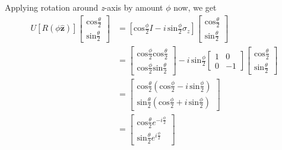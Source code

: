 \begin{alphaparts}
Applying rotation around \textit{z}-axis by amount $\phi$ now, we get 
\begin{equation*}
    \begin{split}
        U[R(\phi\hat{\mathbf{z}})]
        \begin{bmatrix}
            \textrm{cos}\frac{\theta}{2} \\
            \textrm{sin}\frac{\theta}{2}
        \end{bmatrix} & = \left[ \textrm{cos}\frac{\phi}{2}I - i \, \textrm{sin}\frac{\phi}{2}\sigma_{z} \right]
        \begin{bmatrix}
            \textrm{cos}\frac{\theta}{2} \\
            \textrm{sin}\frac{\theta}{2}
        \end{bmatrix} \\
        & = 
        \begin{bmatrix}
            \textrm{cos}\frac{\phi}{2}\textrm{cos}\frac{\theta}{2} \\
            \textrm{cos}\frac{\phi}{2}\textrm{sin}\frac{\theta}{2}
        \end{bmatrix} - i \, \textrm{sin}\frac{\phi}{2}
        \begin{bmatrix}
            1 & 0 \\
            0 & -1
        \end{bmatrix}
        \begin{bmatrix}
            \textrm{cos}\frac{\theta}{2} \\
            \textrm{sin}\frac{\theta}{2}
        \end{bmatrix} \\
        & = 
        \begin{bmatrix}
            \textrm{cos}\frac{\theta}{2} \left( \textrm{cos}\frac{\phi}{2} - i \, \textrm{sin}\frac{\phi}{2}\right) \\
            \textrm{sin}\frac{\theta}{2} \left( \textrm{cos}\frac{\phi}{2} + i \, \textrm{sin}\frac{\phi}{2} \right)
        \end{bmatrix} \\
        & = 
        \begin{bmatrix}
            \textrm{cos}\frac{\theta}{2}e^{-i\frac{\phi}{2}} \\
            \textrm{sin}\frac{\theta}{2}e^{i\frac{\phi}{2}}
        \end{bmatrix}
    \end{split}
\end{equation*}


\end{alphaparts}
